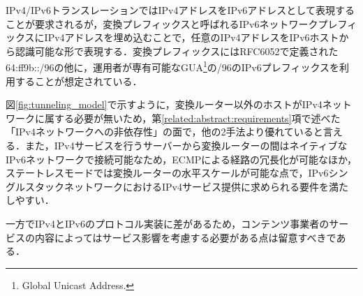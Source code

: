 IPv4/IPv6トランスレーションではIPv4アドレスをIPv6アドレスとして表現することが要求されるが，変換プレフィックスと呼ばれるIPv6ネットワークプレフィックスにIPv4アドレスを埋め込むことで，任意のIPv4アドレスをIPv6ホストから認識可能な形で表現する．変換プレフィックスにはRFC6052で定義された64:ff9b::/96の他に，運用者が専有可能なGUA\footnote{Global Unicast Address. }の/96のIPv6プレフィックスを利用することが想定されている\cite{RFC6052}．

図\ref{fig:tunneling_model}で示すように，変換ルーター以外のホストがIPv4ネットワークに属する必要が無いため，第\ref{related:abstract:requirements}項で述べた「IPv4ネットワークへの非依存性」の面で，他の2手法より優れていると言える．また，IPv4サービスを行うサーバーから変換ルーターの間はネイティブなIPv6ネットワークで接続可能なため，ECMP\cite{rfc2992}による経路の冗長化が可能なほか，ステートレスモードでは変換ルーターの水平スケールが可能な点で，IPv6シングルスタックネットワークにおけるIPv4サービス提供に求められる要件を満たしやすい．


一方でIPv4とIPv6のプロトコル実装に差があるため，コンテンツ事業者のサービスの内容によってはサービス影響を考慮する必要がある点は留意すべきである．

